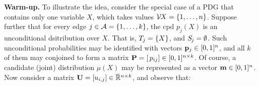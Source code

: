 \documentclass[twoside]{article}
\begin{document}
\textbf{Warm-up.}
To illustrate the idea, consider the special case of a PDG that
contains only one variable $X$, which takes values $\mathcal V\mskip-2mu X = \{1, \ldots, n\}$.
Suppose further that for every edge $j \in \mathcal A = \{1, \ldots, k\}$, the cpd $p_j(X)$ is an unconditional dsitribution over $X$.
That is, $\Tgt j = \{ X \}$, and $\Src j = \emptyset$.
Such unconditional probabilities may be identified with vectors $\mathbf{p}_j \in [0,1]^n$, and all $k$ of them may conjoined to form a
matrix $\mathbf{P} = [\,p_{ij}] \in [0,1]^{n \times k}$.
Of course, a candidate (joint) distribution $\mu(X)$
may be represented as a vector $\mathbf{m} \in [0,1]^n$.
%
Now consider a matrix $\mathbf{U} = [u_{i,j}] \in \mskip1mu\overline{\mskip-1mu\mathbb R\!}\,^{n \times k}$,
and observe that:
\end{document}
